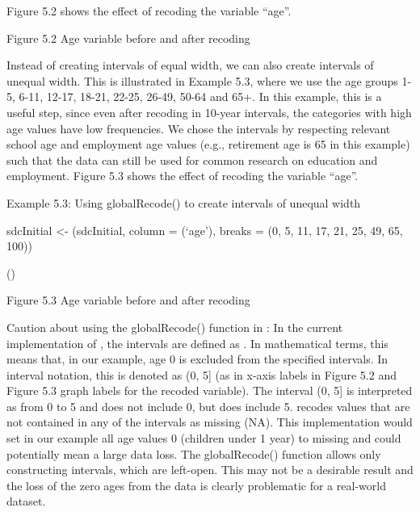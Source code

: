 \documentclass[letterpaper,10pt,english]{sphinxmanual}
\begin{document}
Figure 5.2 shows the effect of recoding the variable “age”.

\noindent{}

Figure 5.2 Age variable before and after recoding

Instead of creating intervals of equal width, we can also create
intervals of unequal width. This is illustrated in Example 5.3, where we
use the age groups 1-5, 6-11, 12-17, 18-21, 22-25, 26-49, 50-64 and 65+.
In this example, this is a useful step, since even after recoding in
10-year intervals, the categories with high age values have low
frequencies. We chose the intervals by respecting relevant school age
and employment age values (e.g., retirement age is 65 in this example)
such that the data can still be used for common research on education
and employment. Figure 5.3 shows the effect of recoding the variable
“age”.

Example 5.3: Using globalRecode() to create intervals of unequal width

sdcInitial \textless{}- (sdcInitial, column = (‘age’),
breaks = (0, 5, 11, 17, 21, 25, 49, 65, 100))


()

\begin{DUlineblock}{0em}
\item[] \sphinxcode{\sphinxupquote{\#\#    (0,5{]}   (5,11{]}  (11,17{]}  (17,21{]}  (21,25{]}  (25,49{]}  (49,65{]} (65,100{]}}}
\item[] 
\end{DUlineblock}

\noindent{}

Figure 5.3 Age variable before and after recoding

Caution about using the globalRecode() function in : In the
current implementation of , the intervals are defined as
. In mathematical terms, this means that, in our example,
age 0 is excluded from the specified intervals. In interval notation,
this is denoted as (0, 5{]} (as in x-axis labels in Figure 5.2 and Figure
5.3 graph labels for the recoded variable). The interval (0, 5{]} is
interpreted as from 0 to 5 and does not include 0, but does include 5.
 recodes values that are not contained in any of the intervals as
missing (NA). This implementation would set in our example all age
values 0 (children under 1 year) to missing and could potentially mean a
large data loss. The globalRecode() function allows only constructing
intervals, which are left-open. This may not be a desirable result and
the loss of the zero ages from the data is clearly problematic for a
real-world dataset.
\end{document}
